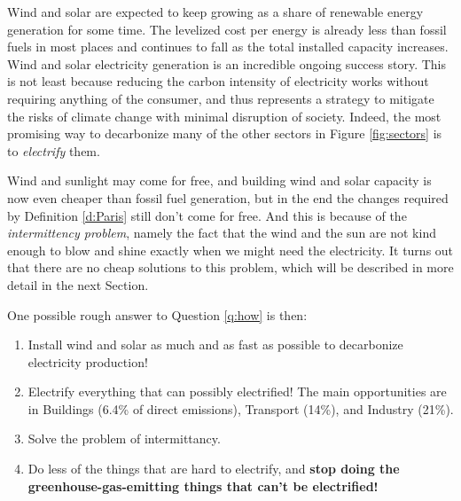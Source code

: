 Wind and solar are expected to keep growing as a share of renewable energy generation for some time. The levelized cost per energy is already less than fossil fuels in most places and continues to fall as the total installed capacity increases\cite{Bloomberg2016, Creutzig2017}. Wind and solar electricity generation is an incredible ongoing success story. This is not least because reducing the carbon intensity of electricity works without requiring anything of the consumer, and thus represents a strategy to mitigate the risks of climate change with minimal disruption of society. Indeed, the most promising way to decarbonize many of the other sectors in Figure \ref{fig:sectors} is to \textit{electrify} them. 

Wind and sunlight may come for free, and building wind and solar capacity is now even cheaper than fossil fuel generation, but in the end the changes required by Definition \ref{d:Paris} still don't come for free. And this is because of the \textit{intermittency problem}, namely the fact that the wind and the sun are not kind enough to blow and shine exactly when we might need the electricity. It turns out that there are no cheap solutions to this problem, which will be described in more detail in the next Section. 

One possible rough answer to Question \ref{q:how} is then:

\begin{enumerate}
	\item Install wind and solar as much and as fast as possible to decarbonize electricity production!
	
	\item Electrify everything that can possibly electrified! The main opportunities are in Buildings (6.4\% of direct  emissions), Transport (14\%), and Industry (21\%). \label{it:electrify}

	\item Solve the problem of intermittancy. \label{it:intermittant}
	
	\item Do less of the things that are hard to electrify, and \textbf{stop doing the greenhouse-gas-emitting things that can't be electrified!} \label{it:sacrifice}
\end{enumerate}

